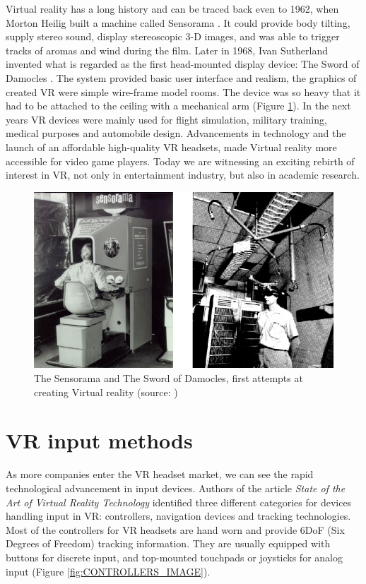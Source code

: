 Virtual reality has a long history and can be traced back even to 1962, when Morton Heilig built a machine called Sensorama \cite{SENSORAMA}. It could provide body tilting, supply stereo sound, display stereoscopic 3-D images, and was able to trigger tracks of aromas and wind during the film. Later in 1968, Ivan Sutherland invented what is regarded as the first head-mounted display device: The Sword of Damocles \cite{DAMOCLES}. The system provided basic user interface and realism, the graphics of created VR were simple wire-frame model rooms. The device was so heavy that it had to be attached to the ceiling with a mechanical arm (Figure  \ref{fig:FIRST_VR}). In the next years VR devices were mainly used for flight simulation, military training, medical purposes and automobile design. Advancements in technology and the launch of an affordable high-quality VR headsets, made Virtual reality more accessible for video game players. Today we are witnessing an exciting rebirth of interest in VR, not only in entertainment industry, but also in academic research.

\begin{figure}[th]
\centering
\includegraphics[width=1\textwidth]{img/first_vr.png}
\caption{The Sensorama and The Sword of Damocles, first attempts at creating Virtual reality (source: \cite{SENSORAMA_IMAGE}\cite{DAMOCLES})}
\label{fig:FIRST_VR}
\end{figure}

\section{VR input methods}

As more companies enter the VR headset market, we can see the rapid technological advancement in input devices. Authors of the article \textit{State of the Art of Virtual Reality Technology} \cite{VR_TECHNOLOGY} identified three different categories for devices handling input in VR: controllers, navigation devices and tracking technologies. Most of the controllers for VR headsets are hand worn and provide 6DoF (Six Degrees of Freedom) tracking information. They are usually equipped with buttons for discrete input, and top-mounted touchpads or joysticks for analog input (Figure \ref{fig:CONTROLLERS_IMAGE}).

